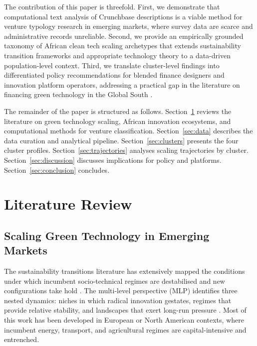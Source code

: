 \documentclass[review,12pt]{elsarticle}
\begin{document}
The contribution of this paper is threefold. First, we demonstrate
that computational text analysis of Crunchbase descriptions is a
viable method for venture typology research in emerging markets, where
survey data are scarce and administrative records unreliable.
Second, we provide an empirically grounded taxonomy of African clean
tech scaling archetypes that extends sustainability transition
frameworks \citep{markard2020sustainability} and appropriate
technology theory \citep{kaplinsky2011schumacher} to a data-driven
population-level context. Third, we translate cluster-level findings
into differentiated policy recommendations for blended finance
designers and innovation platform operators, addressing a practical
gap in the literature on financing green technology in the Global
South \citep{reimsbach2022blended, lall2021scaling}.

The remainder of the paper is structured as follows.
Section~\ref{sec:lit} reviews the literature on green technology
scaling, African innovation ecosystems, and computational methods for
venture classification. Section~\ref{sec:data} describes the data
curation and analytical pipeline. Section~\ref{sec:clusters} presents
the four cluster profiles. Section~\ref{sec:trajectories} analyses
scaling trajectories by cluster. Section~\ref{sec:discussion}
discusses implications for policy and platforms.
Section~\ref{sec:conclusion} concludes.


\section{Literature Review}
\label{sec:lit}

\subsection{Scaling Green Technology in Emerging Markets}

The sustainability transitions literature has extensively mapped the
conditions under which incumbent socio-technical regimes are
destabilised and new configurations take hold
\citep{geels2002technological, markard2020sustainability}. The
multi-level perspective (MLP) identifies three nested dynamics:
niches in which radical innovation gestates, regimes that provide
relative stability, and landscapes that exert long-run pressure
\citep{geels2002technological}. Most of this work has been developed
in European or North American contexts, where incumbent energy,
transport, and agricultural regimes are capital-intensive and
entrenched.
\end{document}
